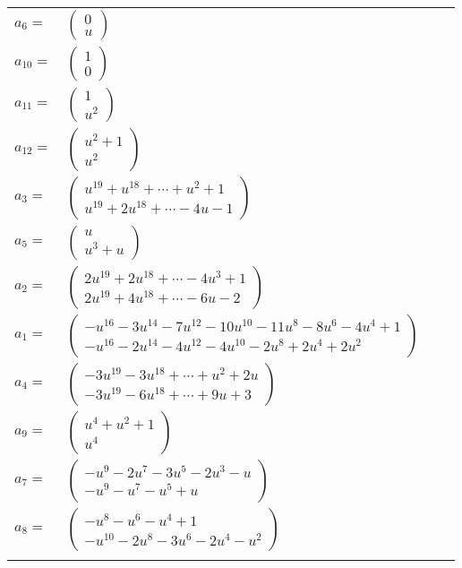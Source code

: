 \documentclass[1p]{elsarticle_modified}
\theoremstyle{definition}
\begin{document}
\begin{tabular}{m{7pt} m{180pt} m{7pt} m{180pt} }
\flushright $a_{6}=$&$\begin{pmatrix}0\\u\end{pmatrix}$ \\
\flushright $a_{10}=$&$\begin{pmatrix}1\\0\end{pmatrix}$ \\
\flushright $a_{11}=$&$\begin{pmatrix}1\\u^2\end{pmatrix}$ \\
\flushright $a_{12}=$&$\begin{pmatrix}u^2+1\\u^2\end{pmatrix}$ \\
\flushright $a_{3}=$&$\begin{pmatrix}u^{19}+u^{18}+\cdots+u^2+1\\u^{19}+2 u^{18}+\cdots-4 u-1\end{pmatrix}$ \\
\flushright $a_{5}=$&$\begin{pmatrix}u\\u^3+u\end{pmatrix}$ \\
\flushright $a_{2}=$&$\begin{pmatrix}2 u^{19}+2 u^{18}+\cdots-4 u^3+1\\2 u^{19}+4 u^{18}+\cdots-6 u-2\end{pmatrix}$ \\
\flushright $a_{1}=$&$\begin{pmatrix}- u^{16}-3 u^{14}-7 u^{12}-10 u^{10}-11 u^8-8 u^6-4 u^4+1\\- u^{16}-2 u^{14}-4 u^{12}-4 u^{10}-2 u^8+2 u^4+2 u^2\end{pmatrix}$ \\
\flushright $a_{4}=$&$\begin{pmatrix}-3 u^{19}-3 u^{18}+\cdots+u^2+2 u\\-3 u^{19}-6 u^{18}+\cdots+9 u+3\end{pmatrix}$ \\
\flushright $a_{9}=$&$\begin{pmatrix}u^4+u^2+1\\u^4\end{pmatrix}$ \\
\flushright $a_{7}=$&$\begin{pmatrix}- u^9-2 u^7-3 u^5-2 u^3- u\\- u^9- u^7- u^5+u\end{pmatrix}$ \\
\flushright $a_{8}=$&$\begin{pmatrix}- u^8- u^6- u^4+1\\- u^{10}-2 u^8-3 u^6-2 u^4- u^2\end{pmatrix}$\\&\end{tabular}
\end{document}
